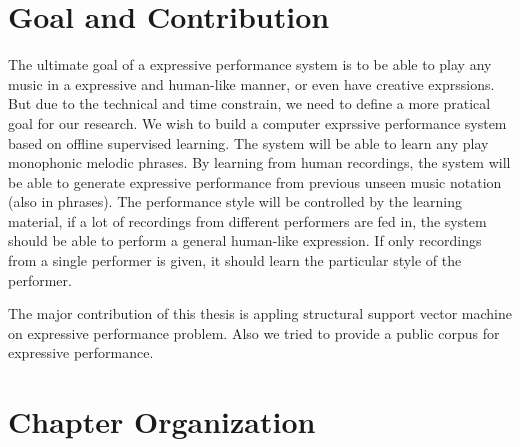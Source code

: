 \section{Goal and Contribution}
The ultimate goal of a expressive performance system is to be able to play any music in a expressive and human-like manner, or even have creative exprssions. But due to the technical and time constrain, we need to define a more pratical goal for our research. We wish to build a computer exprssive performance system based on offline supervised learning. The system will be able to learn any play monophonic melodic phrases. By learning from human recordings, the system will be able to generate expressive performance from previous unseen music notation (also in phrases). The performance style will be controlled by the learning material, if a lot of recordings from different performers are fed in, the system should be able to perform a general human-like expression. If only recordings from a single performer is given, it should learn the particular style of the performer.


The major contribution of this thesis is appling structural support vector machine on expressive performance problem. Also we tried to provide a public corpus for expressive performance. 
%
%
\section{Chapter Organization}
